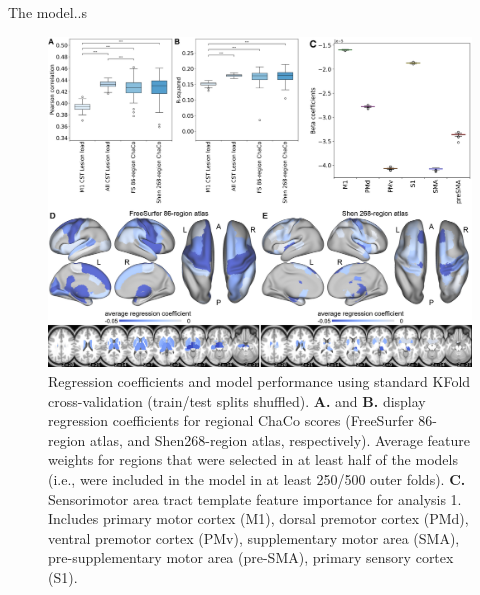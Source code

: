\documentclass[10pt]{article}
\begin{document}
The model..s
\begin{figure}[htp]
\centering
\includegraphics[width=1\linewidth]{figures/Analysis1.png}
\caption{Regression coefficients and model performance using standard KFold cross-validation (train/test splits shuffled). \textbf{A.} and \textbf{B.} display regression coefficients for regional ChaCo scores (FreeSurfer 86-region atlas, and Shen268-region atlas, respectively). Average feature weights for regions that were selected in at least half of the models (i.e., were included in the model in at least 250/500 outer folds). \textbf{C.} Sensorimotor area tract template feature importance for analysis 1. Includes primary motor cortex (M1), dorsal premotor cortex (PMd), ventral premotor cortex (PMv), supplementary motor area (SMA), pre-supplementary motor area (pre-SMA), primary sensory cortex (S1).}
\label{nemotool}
\end{figure}
\end{document}
